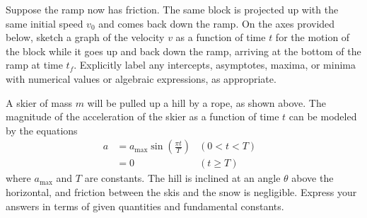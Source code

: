 \documentclass{../../oss-classkick-exam}
\begin{document}
\begin{questions}
\begin{parts}
  \item Suppose the ramp now has friction. The same block is projected up with
    the same initial speed $v_0$ and comes back down the ramp. On the axes
    provided below, sketch a graph of the velocity $v$ as a function of time $t$
    for the motion of the block while it goes up and back down the ramp,
    arriving at the bottom of the ramp at time $t_f$. Explicitly label any
    intercepts, asymptotes, maxima, or minima with numerical values or
    algebraic expressions, as appropriate.
    \begin{center}
    \end{center}
  \end{parts}
  \newpage
  

  \question A skier of mass $m$ will be pulled up a hill by a rope, as shown
  above. The magnitude of the acceleration of the skier as a function of time
  $t$ can be modeled by the equations
  \begin{align*}
    a &=a_\text{max}\sin\left(\frac{\pi t}{T}\right)  &(0<t<T)&\\
    &=0 & (t\geq T)&
  \end{align*}
  where $a_\text{max}$ and $T$ are constants. The hill is inclined at an angle
  $\theta$ above the horizontal, and friction between the skis and the snow is
  negligible. Express your answers in terms of given quantities and fundamental
  constants.
\end{questions}
\end{document}
